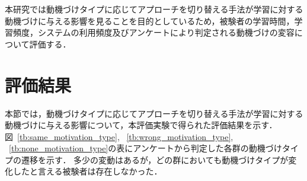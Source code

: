 本研究では動機づけタイプに応じてアプローチを切り替える手法が学習に対する動機づけに与える影響を見ることを目的としているため，被験者の学習時間，学習頻度，システムの利用頻度及びアンケートにより判定される動機づけの変容について評価する．

\section{評価結果}
本節では，動機づけタイプに応じてアプローチを切り替える手法が学習に対する動機づけに与える影響について，本評価実験で得られた評価結果を示す．
図~\ref{tb:same_motivation_type}, ~\ref{tb:wrong_motivation_type}, ~\ref{tb:none_motivation_type}の表にアンケートから判定した各群の動機づけタイプの遷移を示す．
多少の変動はあるが，どの群においても動機づけタイプが変化したと言える被験者は存在しなかった．

